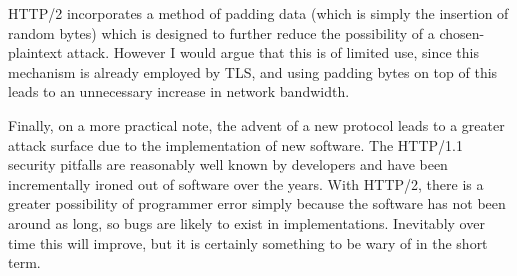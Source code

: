 HTTP/2 incorporates a method of padding data (which is simply the insertion of random bytes) which is designed to further reduce the possibility of a chosen\hyp{}plaintext attack. However I would argue that this is of limited use, since this mechanism is already employed by TLS, and using padding bytes on top of this leads to an unnecessary increase in network bandwidth.

Finally, on a more practical note, the advent of a new protocol leads to a greater attack surface due to the implementation of new software. The HTTP/1.1 security pitfalls are reasonably well known by developers and have been incrementally ironed out of software over the years. With HTTP/2, there is a greater possibility of programmer error simply because the software has not been around as long, so bugs are likely to exist in implementations. Inevitably over time this will improve, but it is certainly something to be wary of in the short term.

